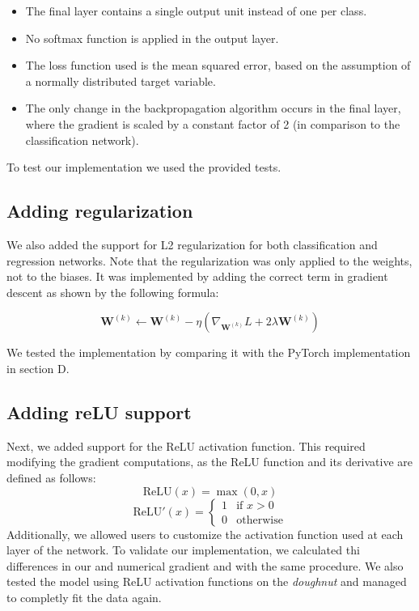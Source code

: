 \documentclass[9pt]{IEEEtran}
\begin{document}
\begin{itemize}
    \item The final layer contains a single output unit instead of one per class.
    \item No softmax function is applied in the output layer.
    \item The loss function used is the mean squared error, based on the assumption of a normally distributed target variable.
    \item The only change in the backpropagation algorithm occurs in the final layer, where the gradient is scaled by a constant factor of 2 (in comparison to the classification network).
\end{itemize}

To test our implementation we used the provided tests.

\subsection{Adding regularization}
We also added the support for L2 regularization for both classification and regression networks. 
Note that the regularization was only applied to the weights, not to the biases.
It was implemented by adding the correct term in gradient descent
  as shown by the following formula:

\[
\mathbf{W}^{(k)} \leftarrow \mathbf{W}^{(k)} - \eta \left( \nabla_{\mathbf{W}^{(k)}} L + 2\lambda \mathbf{W}^{(k)} \right)
\]

We tested the implementation by comparing it with the PyTorch implementation in section D.

\subsection{Adding reLU support}
Next, we added support for the ReLU activation function. This required modifying the gradient computations, as the ReLU function and its derivative are defined as follows:
\[
\text{ReLU}(x) = \max(0, x)
\]
\[
\text{ReLU}'(x) =
\begin{cases}
1 & \text{if } x > 0 \\
0 & \text{otherwise}
\end{cases}
\]
Additionally, we allowed users to customize the activation function used at each layer
 of the network. To validate our implementation, we calculated thi differences in our and 
 numerical gradient and with the same procedure. We also tested the model using ReLU activation
  functions on the \textit{doughnut} and managed to completly fit the data again.
\end{document}
